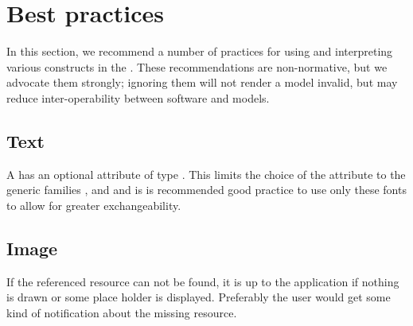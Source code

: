 
\section{Best practices}
\label{best-practices}

In this section, we recommend a number of practices for using and
interpreting various constructs in the \RenderPackage.
These recommendations are non-normative, but we advocate them strongly;
ignoring them will not render a model invalid, but may reduce
inter-operability between software and models.


\subsection{Text}

A \Text has an optional attribute  of type
\FontFamily.  This limits the 
choice of the  attribute to the generic families , 
and  and is is recommended good practice to use only these fonts to allow for greater exchangeability.

\subsection{Image}

If the referenced resource can not be found, it is up to the application if nothing is drawn or some place holder is displayed.
Preferably the user would get some kind of notification about the missing resource.
